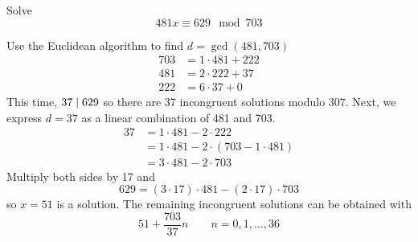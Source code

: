 \begin{example}
    Solve
    $$
    481x \equiv 629 \mod 703
    $$
\end{example}
Use the Euclidean algorithm to find $d = \gcd(481, 703)$ 
$$
\begin{aligned}
    703 &= 1 \cdot 481 + 222 \\
    481 &= 2 \cdot 222 + \boxed{37} \\
    222 &= 6 \cdot 37 + 0
\end{aligned}
$$
This time, $37 \mathrel{\mid} 629$ so there are 37 incongruent solutions modulo $307$. Next, we express $d = 37$ as a linear combination of 481 and 703.
$$
\begin{aligned}
    37 &= 1 \cdot 481 - 2 \cdot 222 \\
    &= 1 \cdot 481 - 2 \cdot (703 - 1 \cdot 481) \\
    &= 3 \cdot 481 - 2 \cdot 703
\end{aligned}
$$
Multiply both sides by 17 and
$$
629 = (3 \cdot 17) \cdot 481 - (2 \cdot 17) \cdot 703
$$
so $x = 51$ is a solution. The remaining incongruent solutions can be obtained with
$$
51 + \frac{703}{37}n \qquad n = 0,1,\ldots,36
$$